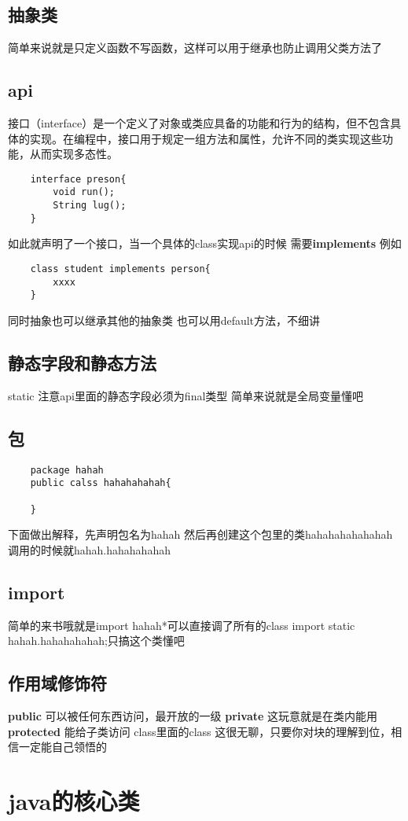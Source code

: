 \documentclass[a4paper,12pt]{ctexbook}
\begin{document}
\subsection{抽象类}
简单来说就是只定义函数不写函数，这样可以用于继承也防止调用父类方法了
\subsection{api}

接口（interface）是一个定义了对象或类应具备的功能和行为的结构，但不包含具体的实现。在编程中，接口用于规定一组方法和属性，允许不同的类实现这些功能，从而实现多态性。
\begin{lstlisting}
    interface preson{
        void run();
        String lug();
    }
\end{lstlisting}
如此就声明了一个接口，当一个具体的class实现api的时候 需要\textbf{implements}
例如
\begin{lstlisting}
    class student implements person{
        xxxx
    }
\end{lstlisting}
同时抽象也可以继承其他的抽象类
也可以用default方法，不细讲
\subsection{静态字段和静态方法}
static 注意api里面的静态字段必须为final类型
简单来说就是全局变量懂吧
\subsection{包}
\begin{lstlisting}
    package hahah
    public calss hahahahahah{

    }
\end{lstlisting}
下面做出解释，先声明包名为hahah 然后再创建这个包里的类hahahahahahahah
调用的时候就hahah.hahahahahah
\subsection{import }
简单的来书哦就是import hahah*可以直接调了所有的class
import static hahah.hahahahahah;只搞这个类懂吧
\subsection{作用域修饰符}
\textbf{public} 可以被任何东西访问，最开放的一级
\textbf{private} 这玩意就是在类内能用
\textbf{protected} 能给子类访问
class里面的class 这很无聊，只要你对块的理解到位，相信一定能自己领悟的
\section{java的核心类}
\end{document}
